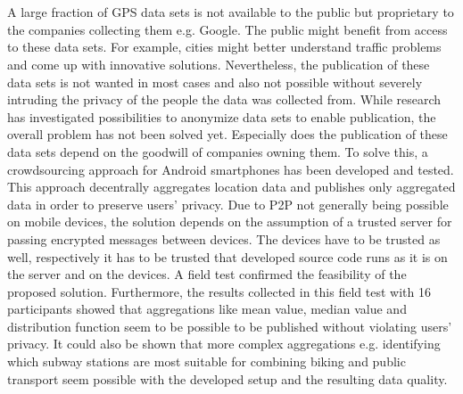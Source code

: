 \chapter{\abstractname}

A large fraction of GPS data sets is not available to the public but proprietary to the companies collecting them e.g. Google. The public might benefit from access to these data sets. For example, cities might better understand traffic problems and come up with innovative solutions. Nevertheless, the publication of these data sets is not wanted in most cases and also not possible without severely intruding the privacy of the people the data was collected from. While research has investigated possibilities to anonymize data sets to enable publication, the overall problem has not been solved yet. Especially does the publication of these data sets depend on the goodwill of companies owning them. To solve this, a crowdsourcing approach for Android smartphones has been developed and tested. This approach decentrally aggregates location data and publishes only aggregated data in order to preserve users' privacy. Due to P2P not generally being possible on mobile devices, the solution depends on the assumption of a trusted server for passing encrypted messages between devices. The devices have to be trusted as well, respectively it has to be trusted that developed source code runs as it is on the server and on the devices. A field test confirmed the feasibility of the proposed solution. Furthermore, the results collected in this field test with 16 participants showed that aggregations like mean value, median value and distribution function seem to be possible to be published without violating users' privacy. It could also be shown that more complex aggregations e.g. identifying which subway stations are most suitable for combining biking and public transport seem possible with the developed setup and the resulting data quality.